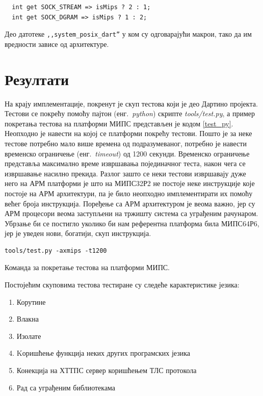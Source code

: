 \documentclass[12pt,oneside]{memoir}
\begin{document}
\begin{listing}
\begin{verbatim}
  int get SOCK_STREAM => isMips ? 2 : 1;
  int get SOCK_DGRAM => isMips ? 1 : 2;
\end{verbatim}
\caption{Део датотеке \texttt{,,system\_posix\_dart''} у ком су одговарајући макрои, тако да им вредности зависе од архитектуре.}
\label{system_posix_dart}
\end{listing}

\section{Резултати}
\label{rezultati}

На крају имплементације, покренут је скуп тестова који је део Дартино пројекта. Тестови се покрећу помоћу пајтон (енг.~\textit{python}) скрипте \textit{tools/test.py}, а пример покретања тестова на платформи МИПС представљен је кодом \ref{test_py}. Неопходно је навести на којој се платформи покрећу тестови. Пошто је за неке тестове потребно мало више времена од подразумеваног, потребно је навести временско ограничење (енг.~\textit{timeout}) од 1200 секунди. Временско ограничење представља максимално време извршавања појединачног теста, након чега се извршавање насилно прекида. Разлог зашто се неки тестови извршавају дуже него на АРМ платформи је што на МИПС32Р2 не постоје неке инструкције које постоје на АРМ архитектури, па је било неопходно имплементирати их помоћу већег броја инструкција. Поређење са АРМ архитектуром је веома важно, јер су АРМ процесори веома заступљени на тржишту система са уграђеним рачунаром. Убрзање би се постигло уколико би нам референтна платформа била МИПС64Р6, јер је уведен нови, богатији, скуп инструкција.\\

\begin{listing}
\begin{verbatim}
tools/test.py -axmips -t1200
\end{verbatim}
\caption{Команда за покретање тестова на платформи МИПС.}
\label{test_py}
\end{listing}

Постојећим скуповима тестова тестиране су следеће карактеристике језика:
\begin{enumerate}
\item Корутине
\item Влакна
\item Изолате
\item Kоришћење функција неких других програмских језика
\item Конекција на ХТТПС сервер коришћењем ТЛС протокола
\item Рад са уграђеним библиотекама
\end{enumerate}
\end{document}
